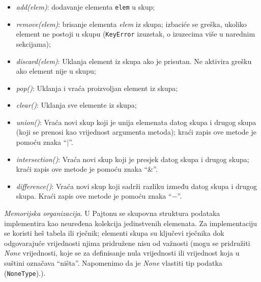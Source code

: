 \begin{itemize}
	\item \textit{add(elem)}: dodavanje elementa \texttt{elem} u skup; 
	\item \textit{remove(elem)}: brisanje elementa \textit{elem} iz skupa; izbaciće se greška, ukoliko element ne postoji u skupu (\texttt{KeyError} izuzetak, o izuzecima više u narednim sekcijama);
	\item \textit{discard(elem)}: Uklanja element iz skupa ako je prisutan. Ne aktivira grešku ako element nije u skupu;
	\item \textit{pop()}: Uklanja i vraća proizvoljan element iz skupa;
	\item \textit{clear()}: Uklanja sve elemente iz skupa;
	\item \textit{union()}: Vraća novi skup koji je unija elemenata datog skupa i drugog skupa (koji se prenosi kao vrijednost argumenta metoda); kraći zapis ove metode je pomoću znaka  ``$\mid$''.
    \item \textit{intersection()}: Vraća novi skup koji je presjek datog skupa i drugog skupa; kraći zapis ove metode je pomoću znaka ``$\&$''.
    \item \textit{difference()}: Vraća novi skup koji sadrži razliku između datog skupa i drugog skupa. Kraći zapis ove metode je pomoću znaka ``$-$''. 
\end{itemize}
 
 
 


\textit{Memorijska organizacija}. U Pajtonu se skupovna struktura podataka implementira kao neuređena kolekcija jedinstvenih elemenata. Za implementaciju se koristi heš tabela ili rječnik; elementi skupa su ključevi rječnika dok odgovarajuće vrijednosti njima pridružene nisu od važnosti (mogu se pridružiti \textit{None} vrijednosti, koje se za definisanje nula vrijednosti ili vrijednost koja u suštini  označava ``ništa''. Napomenimo da je \emph{None} vlastiti tip podatka (\texttt{NoneType}).).  

